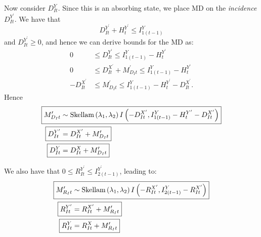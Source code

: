 \documentclass[a4paper]{article}
\begin{document}
Now consider $D^Y_{It}$. Since this is an absorbing state, we place MD on the \textit{incidence} $D^{Y^\prime}_{It}$. We have that
\begin{equation*}
    D^{Y^\prime}_{It} + H^{Y^\prime}_t \leq I^Y_{1(t - 1)}
\end{equation*}
and $D^{Y^\prime}_{It} \geq 0$, and hence we can derive bounds for the MD as:
\begin{align*}
    0 &\leq D^{Y^\prime}_{It} \leq I^Y_{1(t - 1)} - H^{Y^\prime}_t\\
    0 &\leq D^{X^\prime}_{It} + M^\prime_{D_It} \leq I^Y_{1(t - 1)} - H^{Y^\prime}_t\\ 
    -D^{X^\prime}_{It} &\leq M^\prime_{D_It} \leq I^Y_{1(t - 1)} - H^{Y^\prime}_t - D^{X^\prime}_{It}.
\end{align*}
Hence
\begin{align*}
\Aboxed{M^\prime_{D_It} &\sim \mbox{Skellam}\left(\lambda_1, \lambda_2\right)I\left(-D^{X^\prime}_{It}, I^Y_{1(t - 1)} - H^{Y^\prime}_{t} - D^{X^\prime}_{It}\right)}\\
    \Aboxed{D^{Y^\prime}_{It} &= D^{X^\prime}_{It} + M^\prime_{D_It}}\\
    \Aboxed{D^Y_{It} &= D^X_{It} + M^\prime_{D_It}}
\end{align*}

We also have that $0 \leq R^{Y^\prime}_{It} \leq I^{Y^\prime}_{2(t - 1)}$, leading to:
\begin{align*}
\Aboxed{M^\prime_{R_It} &\sim \mbox{Skellam}\left(\lambda_1, \lambda_2\right)I\left(-R^{X^\prime}_{It}, I^Y_{2(t - 1)} - R^{X^\prime}_{It}\right)}\\
    \Aboxed{R^{Y^\prime}_{It} &= R^{X^\prime}_{It} + M^\prime_{R_It}}\\
    \Aboxed{R^Y_{It} &= R^X_{It} + M^\prime_{R_It}}
\end{align*}
\end{document}
